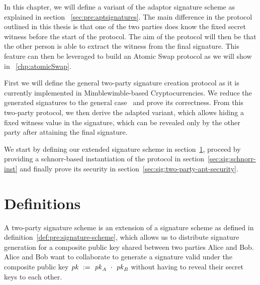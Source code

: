 In this chapter, we will define a variant of the adaptor signature scheme as explained in section ~\ref{sec:pre:aptsignatures}.
The main difference in the protocol outlined in this thesis is that one of the two parties does know the fixed secret witness before the start of the protocol.
The aim of the protocol will then be that the other person is able to extract the witness from the final signature. This feature can then be leveraged to build an Atomic Swap protocol as we
will show in ~\ref{chp:atomicSwap}.


First we will define the general two-party signature creation protocol as it is currently implemented in Mimblewimble-based Cryptocurrencies.
We reduce the generated signatures to the general case~\cite{schnorr1989efficient} and prove its correctness.
From this two-party protocol, we then derive the adapted variant, which allows hiding a fixed witness
value in the signature, which can be revealed only by the other party after attaining the final signature.


We start by defining our extended signature scheme in section~\ref{sec:sig:definitions},
proceed by providing a schnorr-based instantiation of the protocol in section~\ref{sec:sig:schnorr-inst} and finally prove its security in section~\ref{sec:sig:two-party-apt-security}.


\section{Definitions} \label{sec:sig:definitions}

A two-party signature scheme is an extension of a signature scheme as defined in definition~\ref{def:pre:signature-scheme}, which allows us to distribute signature generation for a composite public key shared between two parties Alice and Bob.
Alice and Bob want to collaborate to generate a signature valid under the composite public key $\mathit{pk} ~:=~ \mathit{pk}_{\mathit{A}} ~\cdot~ \mathit{pk}_{\mathit{B}}$ without having to reveal their secret keys to each other.


